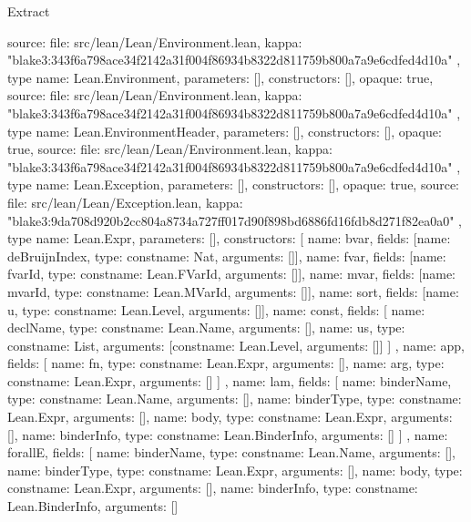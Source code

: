 \begin{lexlean}{Extract}
\begin{toolingmodule}
{{      source: {
        file: src/lean/Lean/Environment.lean,
        kappa: "blake3:343f6a798ace34f2142a31f004f86934b8322d811759b800a7a9e6cdfed4d10a"
      }
    },
    type{
      name: Lean.Environment,
      parameters: [],
      constructors: [],
      opaque: true,
      source: {
        file: src/lean/Lean/Environment.lean,
        kappa: "blake3:343f6a798ace34f2142a31f004f86934b8322d811759b800a7a9e6cdfed4d10a"
      }
    },
    type{
      name: Lean.EnvironmentHeader,
      parameters: [],
      constructors: [],
      opaque: true,
      source: {
        file: src/lean/Lean/Environment.lean,
        kappa: "blake3:343f6a798ace34f2142a31f004f86934b8322d811759b800a7a9e6cdfed4d10a"
      }
    },
    type{
      name: Lean.Exception,
      parameters: [],
      constructors: [],
      opaque: true,
      source: {
        file: src/lean/Lean/Exception.lean,
        kappa: "blake3:9da708d920b2cc804a8734a727ff017d90f898bd6886fd16fdb8d271f82ea0a0"
      }
    },
    type{
      name: Lean.Expr,
      parameters: [],
      constructors: [
        {name: bvar, fields: [{name: deBruijnIndex, type: const{name: Nat, arguments: []}}]},
        {name: fvar, fields: [{name: fvarId, type: const{name: Lean.FVarId, arguments: []}}]},
        {name: mvar, fields: [{name: mvarId, type: const{name: Lean.MVarId, arguments: []}}]},
        {name: sort, fields: [{name: u, type: const{name: Lean.Level, arguments: []}}]},
        {
          name: const,
          fields: [
            {name: declName, type: const{name: Lean.Name, arguments: []}},
            {name: us, type: const{name: List, arguments: [const{name: Lean.Level, arguments: []}]}}
          ]
        },
        {
          name: app,
          fields: [
            {name: fn, type: const{name: Lean.Expr, arguments: []}},
            {name: arg, type: const{name: Lean.Expr, arguments: []}}
          ]
        },
        {
          name: lam,
          fields: [
            {name: binderName, type: const{name: Lean.Name, arguments: []}},
            {name: binderType, type: const{name: Lean.Expr, arguments: []}},
            {name: body, type: const{name: Lean.Expr, arguments: []}},
            {name: binderInfo, type: const{name: Lean.BinderInfo, arguments: []}}
          ]
        },
        {
          name: forallE,
          fields: [
            {name: binderName, type: const{name: Lean.Name, arguments: []}},
            {name: binderType, type: const{name: Lean.Expr, arguments: []}},
            {name: body, type: const{name: Lean.Expr, arguments: []}},
            {name: binderInfo, type: const{name: Lean.BinderInfo, arguments: []}}
}}}
\end{toolingmodule}
\end{lexlean}
